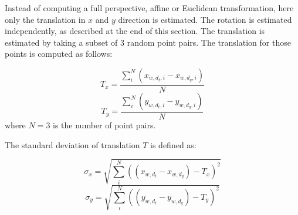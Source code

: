 Instead of computing a full perspective, affine or Euclidean transformation, here only the translation in $x$ and $y$ direction is estimated. The rotation is estimated independently, as described at the end of this section.
The translation is estimated by taking a subset of 3 random point pairs.
The translation for those points is computed as follows:

\begin{equation}
T_x = \frac{\sum_{i}^{N} (x_{w, d_t, i} - x_{w, d_q, i})}{N}
\end{equation}
\begin{equation}
T_y = \frac{\sum_{i}^{N} (y_{w, d_t ,i} - y_{w, d_q, i})}{N}
\end{equation}
where $N = 3$ is the number of point pairs.

The standard deviation of translation  $T$ is defined as:

\begin{equation}
\sigma_x = \sqrt{  \sum_{i}^{N}   ((x_{w, d_t} - x_{w, d_q}) - T_x)^{2}   }
\end{equation}
\begin{equation}
\sigma_y = \sqrt{  \sum_{i}^{N}   ((y_{w, d_t} - y_{w, d_q}) - T_y)^{2}   }
\end{equation}

